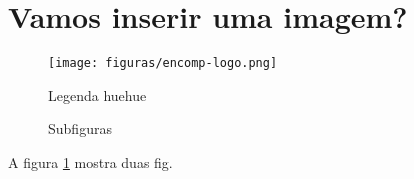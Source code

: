 \documentclass[10pt,a4paper,twocolumn]{book}
\begin{document}
	\section*{Vamos inserir uma imagem?}
	
		\begin{figure}[h]
			\caption{Legenda huehue}
			\texttt{[image: figuras/encomp-logo.png]}
		\end{figure}
	
		\begin{figure}[h]
			\caption{Subfiguras}
			\label{fig:subfiguras}
		\end{figure}
	
		A figura \ref{fig:subfiguras} mostra duas fig.
	
\end{document}

